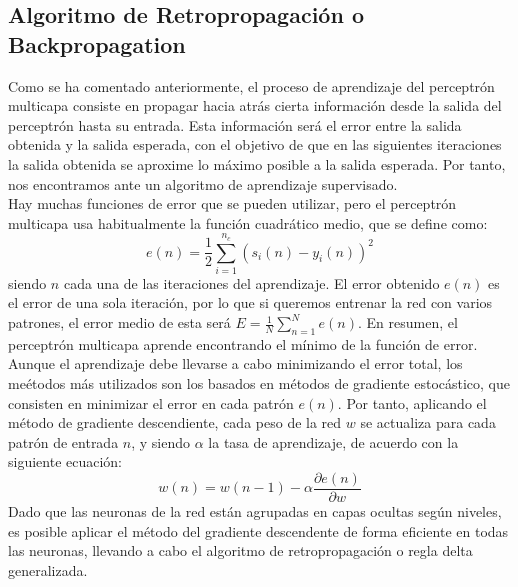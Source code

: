 \subsection{Algoritmo de Retropropagación o Backpropagation}
Como se ha comentado anteriormente, el proceso de aprendizaje del perceptrón multicapa consiste en propagar hacia atrás cierta información desde la salida del perceptrón hasta su entrada. Esta información será el error entre la salida obtenida y la salida esperada, con el objetivo de que en las siguientes iteraciones la salida obtenida se aproxime lo máximo posible a la salida esperada. Por tanto, nos encontramos ante un algoritmo de aprendizaje supervisado.\\
Hay muchas funciones de error que se pueden utilizar, pero el perceptrón multicapa usa habitualmente la función cuadrático medio, que se define como:
\begin{equation}
e(n) = \frac{1}{2}\sum_{i=1}^{n_{c}}(s_{i}(n)-y_{i}(n))^{2}
\end{equation}
siendo ${n}$ cada una de las iteraciones del aprendizaje. El error obtenido ${e(n)}$ es el error de una sola iteración, por lo que si queremos entrenar la red con varios patrones, el error medio de esta será ${E=\frac{1}{N}\sum_{n=1}^{N}e(n)}$. En resumen, el perceptrón multicapa aprende encontrando el mínimo de la función de error.\\
Aunque el aprendizaje debe llevarse a cabo minimizando el error total, los meétodos más utilizados son los basados en métodos de gradiente estocástico, que consisten en minimizar el error en cada patrón ${e(n)}$. Por tanto, aplicando el método de gradiente descendiente, cada peso de la red ${w}$ se actualiza para cada patrón de entrada ${n}$, y siendo ${\alpha}$ la tasa de aprendizaje, de acuerdo con la siguiente ecuación:
\begin{equation}
w(n)=w(n-1)-\alpha \frac{\partial e(n)}{\partial w}
\label{eq_grad}
\end{equation}
Dado que las neuronas de la red están agrupadas en capas ocultas según niveles, es posible aplicar el método del gradiente descendente de forma eficiente en todas las neuronas, llevando a cabo el algoritmo de retropropagación o regla delta generalizada.

